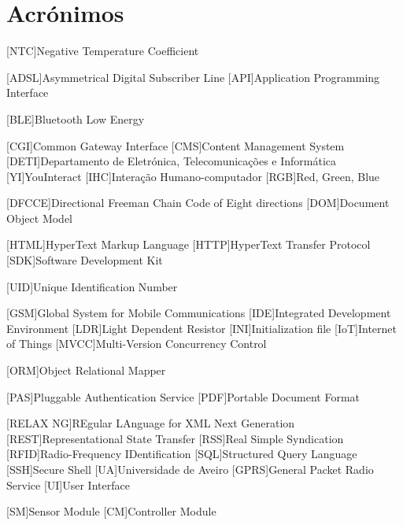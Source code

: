 \chapter*{Acrónimos}

	\begin{acronym}[RELAX NG]
		
		[NTC]{Negative Temperature Coefficient}
				
		{Asymmetrical Digital Subscriber Line}
		[API]{Application Programming Interface}
		
		[BLE]{Bluetooth Low Energy}
		
		[CGI]{Common Gateway Interface}
		[CMS]{Content Management System}
		{Departamento de Eletrónica, Telecomunicações e Informática  }
		[YI]{YouInteract}		
		[IHC]{Interação Humano-computador}	
        [RGB]{Red, Green, Blue}
        
		[DFCCE]{Directional Freeman Chain Code of Eight directions}
		[DOM]{Document Object Model}
		
		{HyperText Markup Language}
		{HyperText Transfer Protocol}		
		[SDK]{Software Development Kit}
        
        [UID]{Unique Identification Number}
        
        
        [GSM]{Global System for Mobile Communications}
		[IDE]{Integrated Development Environment}
		[LDR]{Light Dependent Resistor}
		[INI]{Initialization file}	
		[IoT]{Internet of Things}			
		{Multi-Version Concurrency Control}		

		[ORM]{Object Relational Mapper}
		
		[PAS]{Pluggable Authentication Service}
		[PDF]{Portable Document Format}
		
		[RELAX NG]{REgular LAnguage for XML Next Generation}
		{Representational State Transfer}
		[RSS]{Real Simple Syndication}
		{Radio-Frequency IDentification}
		[SQL]{Structured Query Language}		
		[SSH]{Secure Shell}
		[UA]{Universidade de Aveiro}
        [GPRS]{General Packet Radio Service}
		[UI]{User Interface}
		
		[SM]{Sensor Module}
		[CM]{Controller Module}
		

\end{acronym}
